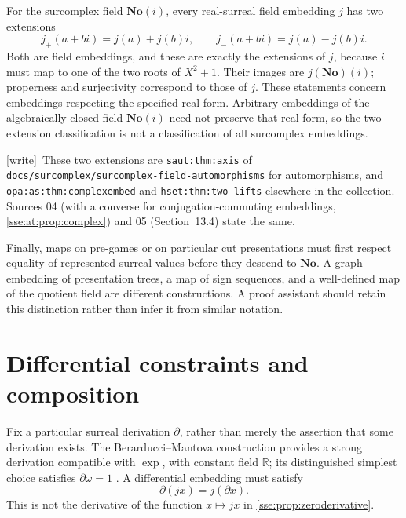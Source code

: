 \documentclass[11pt,a4paper]{article}
\numberwithin{equation}{section}
\theoremstyle{plain}
\theoremstyle{definition}
\theoremstyle{remark}
\newcommand{\No}{\mathbf{No}}
\newcommand{\R}{\mathbb{R}}
\newcommand{\lbl}[1]{\nolinkurl{#1}}%
\newcommand{\fn}[1]{\nolinkurl{#1}}%
\newcommand{\wtag}{\textup{\textsf{[write]}}}%
\newenvironment{wnote}{\par\smallskip\noindent\wtag\ }{\par\smallskip}
\begin{document}
For the surcomplex field $\No(i)$, every real-surreal field embedding $j$
has two extensions
\[
 j_+(a+bi)=j(a)+j(b)i,\qquad
 j_-(a+bi)=j(a)-j(b)i.
\]
Both are field embeddings, and these are exactly the extensions of $j$,
because $i$ must map to one of the two roots of $X^2+1$. Their images are
$j(\No)(i)$; properness and surjectivity correspond to those of $j$.
These statements concern embeddings respecting the specified real form.
Arbitrary embeddings of the algebraically closed field $\No(i)$ need not
preserve that real form, so the two-extension classification is not a
classification of all surcomplex embeddings.
\begin{wnote}These two extensions are \lbl{saut:thm:axis} of \fn{docs/surcomplex/surcomplex-field-automorphisms} for automorphisms, and \lbl{opa:as:thm:complexembed} and \lbl{hset:thm:two-lifts} elsewhere in the collection. Sources 04 (with a converse for conjugation-commuting embeddings, \cref{sse:at:prop:complex}) and 05 (Section~13.4) state the same.\end{wnote}

Finally, maps on pre-games or on particular cut presentations must first
respect equality of represented surreal values before they descend to
$\No$. A graph embedding of presentation trees, a map of sign sequences,
and a well-defined map of the quotient field are different constructions.
A proof assistant should retain this distinction rather than infer it
from similar notation.

\section{Differential constraints and composition}\label{sse:sec:differential}

Fix a particular surreal derivation $\partial$, rather than merely the
assertion that some derivation exists. The Berarducci--Mantova construction
provides a strong derivation compatible with $\exp$, with constant field
$\R$; its distinguished simplest choice satisfies $\partial\omega=1$
\cite{BM}. A differential embedding must satisfy
\[
 \partial(jx)=j(\partial x).
\]
This is not the derivative of the function $x\mapsto jx$ in
\cref{sse:prop:zeroderivative}.
\end{document}
